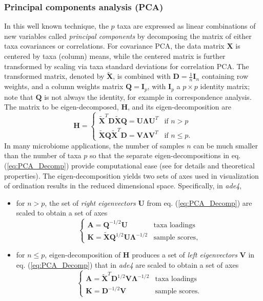 \documentclass[doublespacing]{bmcart}
\def\H{\mathbf{H}}
\def\Q{\mathbf{Q}}
\def\D{\mathbf{D}}
\def\U{\mathbf{U}}
\def\V{\mathbf{V}}
\def\X{\mathbf{X}}
\def\A{\mathbf{A}}
\def\K{\mathbf{K}}
\begin{document}
\subsubsection*{Principal components analysis (PCA)}
In this well known technique, the $p$ taxa are expressed as linear combinations of new variables called {\it principal components} by decomposing the matrix of either taxa covariances or correlations. For covariance  PCA, the data matrix  $\mathbf{X}$ is centered by taxa (column) means, while the centered matrix is further transformed by scaling via taxa standard deviations for correlation PCA. The transformed matrix, denoted by $\mathbf {\tilde X}$, is combined with $\D = \frac{1}{n}\mathbf I_n$ containing row weights, and a column weights matrix $\Q= \mathbf I_p$, with $\mathbf I_p$ a $p \times p$ identity matrix; note that $\Q$ is not always the identity, for example in correspondence analysis. The matrix to be eigen-decomposed, $\H$, and its eigen-decomposition are 
\begin{equation}\label{eq:PCA_Decomp}
\H =
  \begin{cases}
    \mathbf {\tilde X}^T\mathbf D \mathbf {\tilde X} \mathbf Q = \U \mathbf{\Lambda} \U^T	& \text{if $n  > p$} \\
    \mathbf {\tilde X}\mathbf Q \mathbf {\tilde X}^T \mathbf D = \V \mathbf{\Lambda} \V^T	& \text{if $n  \leq p$}.
  \end{cases}
\end{equation}
In many microbiome applications, the number of samples $n$ can be much smaller than the number of taxa $p$ so that the separate eigen-decompositions in eq. (\ref{eq:PCA_Decomp}) provide computational ease (see \cite{Dray1, Cruz_Holmes, Yata} for details and theoretical properties). The eigen-decomposition yields two sets of axes used in visualization of ordination results in the reduced dimensional space. Specifically, in {\it ade4}, 
\begin{itemize}
\item for $n > p$, the set of {\it right eigenvectors} $\U$ from eq. (\ref{eq:PCA_Decomp}) are scaled to obtain a set of axes 
\begin{equation*}
 \begin{cases}
    \A = \Q^{-1/2}\U								& \text{taxa loadings} \\
    \K = \tilde{\X}\Q^{1/2}\U\mathbf{\Lambda}^{-1/2}	& \text{sample scores},
  \end{cases}
\end{equation*} 
\item for $n \leq p$, eigen-decomposition of $\H$ produces a set of {\it left eigenvectors} $\V$ in eq. (\ref{eq:PCA_Decomp}) that in \textit{ade4} are scaled to obtain a set of axes 
\begin{equation*}
 \begin{cases}
    \A =   \mathbf {\tilde X}^T\D^{1/2}\V\mathbf{\Lambda}^{-1/2} 			& \text{taxa loadings} \\
    \K =  \D^{-1/2}\V										& \text{sample scores}.
  \end{cases}
\end{equation*} 
\end{itemize}
\end{document}
